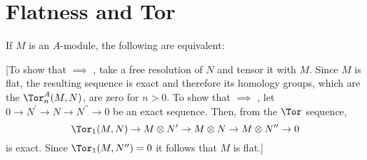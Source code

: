 \section{Flatness and Tor}

\begin{exercise}
If \(M\) is an \(A\)-module, the following are equivalent:
[To show that  \(\implies\) , take a free resolution of \(N\) and tensor it with \(M\).
Since \(M\) is flat, the resulting sequence is exact and therefore its homology groups, which are the \(\Tor_n^A(M, N)\), are zero for \(n > 0\).
To show that  \(\implies\) , let \(0 \to N^\prime \to N \to N^{\prime\prime} \to 0\) be an exact sequence.
Then, from the \(\Tor\) sequence,
\begin{equation*}
\Tor_1(M, N) \to M \otimes N^\prime \to M \otimes N \to M \otimes N^{\prime\prime} \to 0
\end{equation*}
is exact.
Since \(\Tor_1(M, N^{\prime\prime}) = 0\) it follows that \(M\) is flat.]
\end{exercise}

